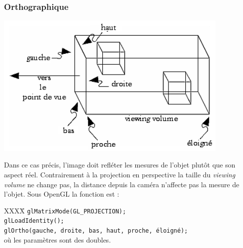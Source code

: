 \subsubsection{Orthographique}
\begin{center}
	 \includegraphics[height=7cm]{img/Ortho}
 \end{center}
Dans ce cas précis, l’image doit refléter les mesures de l’objet plutôt que son aspect réel. Contrairement à la projection en perspective la taille du \textit{viewing volume} ne change pas, la distance depuis la caméra n’affecte pas la mesure de l’objet. Sous OpenGL la fonction est : 
\begin{tabbing}
XXXX\= \kill
\> \verb|glMatrixMode(GL_PROJECTION);|\\
\> \verb|glLoadIdentity();|\\
\> \verb|glOrtho(gauche, droite, bas, haut, proche, éloigné);| \\où les paramètres sont des doubles.
\end{tabbing}




\newpage